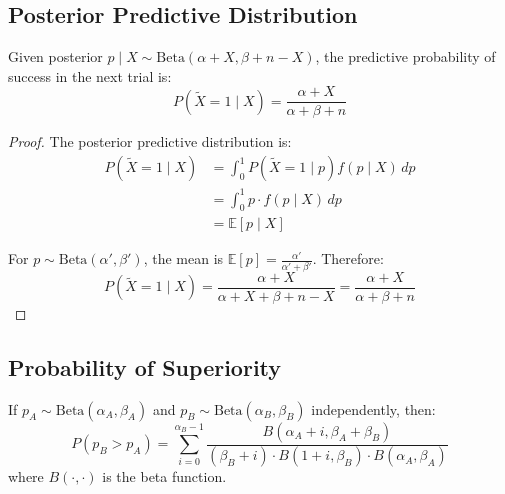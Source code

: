 \subsection{Posterior Predictive Distribution}

\begin{theorem}
Given posterior $p \mid X \sim \text{Beta}(\alpha + X, \beta + n - X)$, the predictive probability of success in the next trial is:
\begin{equation}
P(\tilde{X} = 1 \mid X) = \frac{\alpha + X}{\alpha + \beta + n}
\end{equation}
\end{theorem}

\begin{proof}
The posterior predictive distribution is:
\begin{align}
P(\tilde{X} = 1 \mid X) &= \int_0^1 P(\tilde{X} = 1 \mid p) f(p \mid X) \, dp \\
&= \int_0^1 p \cdot f(p \mid X) \, dp \\
&= \mathbb{E}[p \mid X]
\end{align}

For $p \sim \text{Beta}(\alpha', \beta')$, the mean is $\mathbb{E}[p] = \frac{\alpha'}{\alpha' + \beta'}$. Therefore:
\begin{equation}
P(\tilde{X} = 1 \mid X) = \frac{\alpha + X}{\alpha + X + \beta + n - X} = \frac{\alpha + X}{\alpha + \beta + n}
\end{equation}
\end{proof}

\subsection{Probability of Superiority}

\begin{theorem}
If $p_A \sim \text{Beta}(\alpha_A, \beta_A)$ and $p_B \sim \text{Beta}(\alpha_B, \beta_B)$ independently, then:
\begin{equation}
P(p_B > p_A) = \sum_{i=0}^{\alpha_B-1} \frac{B(\alpha_A + i, \beta_A + \beta_B)}{(\beta_B + i) \cdot B(1+i, \beta_B) \cdot B(\alpha_A, \beta_A)}
\end{equation}
where $B(\cdot, \cdot)$ is the beta function.
\end{theorem}

